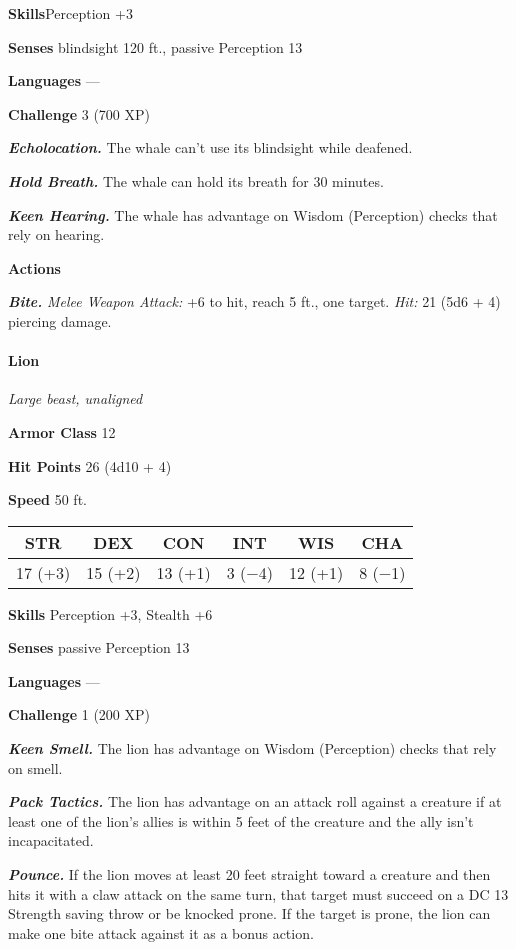 \documentclass[
]{article}
\begin{document}
\textbf{Skills}Perception +3

\textbf{Senses} blindsight 120 ft., passive Perception 13

\textbf{Languages} ---

\textbf{Challenge} 3 (700 XP)

\emph{\textbf{Echolocation.}} The whale can't use its blindsight while
deafened.

\emph{\textbf{Hold Breath.}} The whale can hold its breath for 30
minutes.

\emph{\textbf{Keen Hearing.}} The whale has advantage on Wisdom
(Perception) checks that rely on hearing.

\textbf{Actions}

\emph{\textbf{Bite.}} \emph{Melee Weapon Attack:} +6 to hit, reach 5
ft., one target. \emph{Hit:} 21 (5d6 + 4) piercing damage.

\hypertarget{lion}{%
\paragraph{Lion}\label{lion}}

\emph{Large beast, unaligned}

\textbf{Armor Class} 12

\textbf{Hit Points} 26 (4d10 + 4)

\textbf{Speed} 50 ft.

\begin{longtable}[]{@{}cccccc@{}}
\toprule
STR & DEX & CON & INT & WIS & CHA\tabularnewline
\midrule
\endhead
17 (+3) & 15 (+2) & 13 (+1) & 3 (−4) & 12 (+1) & 8 (−1)\tabularnewline
\bottomrule
\end{longtable}

\textbf{Skills} Perception +3, Stealth +6

\textbf{Senses} passive Perception 13

\textbf{Languages} ---

\textbf{Challenge} 1 (200 XP)

\emph{\textbf{Keen Smell.}} The lion has advantage on Wisdom
(Perception) checks that rely on smell.

\emph{\textbf{Pack Tactics.}} The lion has advantage on an attack roll
against a creature if at least one of the lion's allies is within 5 feet
of the creature and the ally isn't incapacitated.

\emph{\textbf{Pounce.}} If the lion moves at least 20 feet straight
toward a creature and then hits it with a claw attack on the same turn,
that target must succeed on a DC 13 Strength saving throw or be knocked
prone. If the target is prone, the lion can make one bite attack against
it as a bonus action.
\end{document}
